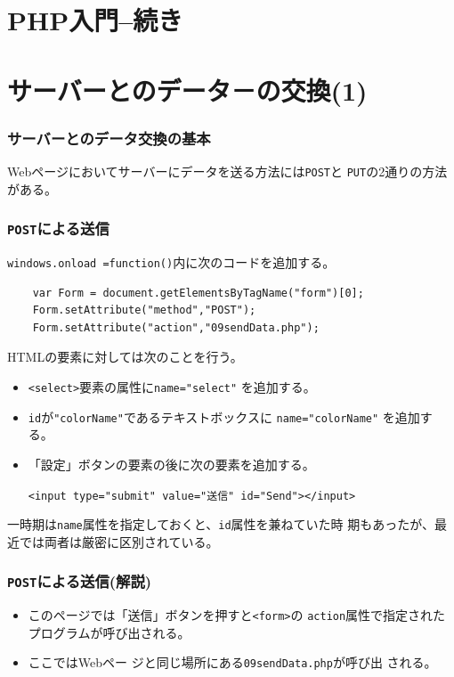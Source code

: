 \section{PHP入門--続き}
 
\section{サーバーとのデータ－の交換(1)}
 \begin{frame}[containsverbatim]
 \frametitle{サーバーとのデータ交換の基本}
 Webページにおいてサーバーにデータを送る方法には\texttt{POST}と
 \texttt{PUT}の2通りの方法がある。
 \end{frame}
 \begin{frame}[containsverbatim]
 \frametitle{\texttt{POST}による送信}
 \texttt{windows.onload =function()}内に次のコードを追加する。
 \begin{Verbatim}
    var Form = document.getElementsByTagName("form")[0];
    Form.setAttribute("method","POST");
    Form.setAttribute("action","09sendData.php");
 \end{Verbatim}
 HTMLの要素に対しては次のことを行う。
 \begin{itemize}
 \item \texttt{<select>}要素の属性に\verb+name="select"+ を追加する。
 \item \texttt{id}が\verb+"colorName"+であるテキストボックスに
       \verb+name="colorName"+ を追加する。
 \item 「設定」ボタンの要素の後に次の要素を追加する。
 \begin{center}
 \verb+<input type="submit" value="送信" id="Send"></input>+ 
 \end{center}
 \end{itemize}
 一時期は\texttt{name}属性を指定しておくと、\texttt{id}属性を兼ねていた時
 期もあったが、最近では両者は厳密に区別されている。
\end{frame}
 \begin{frame}[containsverbatim]
 \frametitle{\texttt{POST}による送信(解説)}
 \begin{itemize}
 \item このページでは「送信」ボタンを押すと\texttt{<form>}の
 \texttt{action}属性で指定されたプログラムが呼び出される。
 \item ここではWebペー ジと同じ場所にある\texttt{09sendData.php}が呼び出
      される。
 \end{itemize}
 \end{frame}
